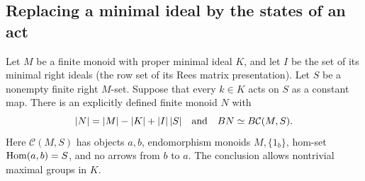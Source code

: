 \subsection{Replacing a minimal ideal by the states of an act}

\begin{theorem}
\label{C:constant-minimal-act-compression}
Let $M$ be a finite monoid with proper minimal ideal $K$, and let
$I$ be the set of its minimal right ideals (the row set of its
Rees matrix presentation).  Let $S$ be a nonempty finite right
$M$-set.  Suppose that every $k\in K$ acts on $S$ as a constant
map.  There is an explicitly defined finite monoid $N$ with
\[
 |N|=|M|-|K|+|I|\,|S|
 \quad\hbox{and}\quad
 BN\simeq B\mathcal C(M,S).
\]
Here $\mathcal C(M,S)$ has objects $a,b$, endomorphism monoids
$M,\{1_b\}$, hom-set $\operatorname{Hom}(a,b)=S$, and no arrows from $b$ to $a$.
The conclusion allows nontrivial maximal groups in $K$.
\end{theorem}
